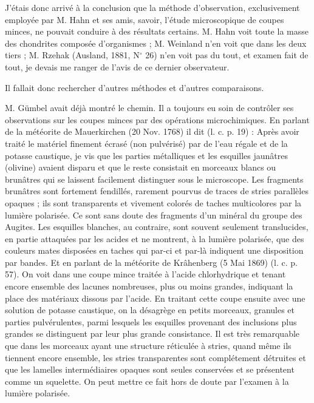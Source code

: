 \documentclass[a4paper, 12pt, oneside, french]{article}
\begin{document}
J'étais donc arrivé à la conclusion que la méthode d'observation, exclusivement employée par M. Hahn et ses amis, savoir, l'étude microscopique de coupes minces, ne pouvait conduire à des résultats certains. M. Hahn voit toute la masse des chondrites composée d'organismes ; M. Weinland n'en voit que dans les deux tiers ; M. Rzehak (Ausland, 1881, N$^{\circ}$ 26) n'en voit pas du tout, et examen fait de tout, je devais me ranger de l'avis de ce dernier observateur.

Il fallait donc rechercher d'autres méthodes et d'autres comparaisons.

M. Gümbel avait déjà montré le chemin. Il a toujours eu soin de contrôler ses observations sur les coupes minces par des opérations microchimiques. En parlant de la météorite de Mauerkirchen (20 Nov. 1768) il dit (l. c. p. 19) : \og Après avoir traité le matériel finement écrasé (non pulvérisé) par de l'eau régale et de la potasse caustique, je vis que les parties métalliques et les esquilles jaunâtres (olivine) avaient disparu et que le reste consistait en morceaux blancs ou brunâtres qui se laissent facilement distinguer sous le microscope. Les fragments brunâtres sont fortement fendillés, rarement pourvus de traces de stries parallèles opaques ; ils sont transparents et vivement colorés de taches multicolores par la lumière polarisée. Ce sont sans doute des fragments d'un minéral du groupe des Augites. Les esquilles blanches, au contraire, sont souvent seulement translucides, en partie attaquées par les acides et ne montrent, à la lumière polarisée, que des couleurs mates disposées en taches qui par-ci et par-là indiquent une disposition par bandes. \fg Et en parlant de la météorite de Krâhenberg (5 Mai 1869) (l. c. p. 57). On voit dans une coupe mince traitée à l'acide chlorhydrique et tenant encore ensemble des lacunes nombreuses, plus ou moins grandes, indiquant la place des matériaux dissous par l'acide. En traitant cette coupe ensuite avec une solution de potasse caustique, on la désagrège en petits morceaux, granules et parties pulvérulentes, parmi lesquels les esquilles provenant des inclusions plus grandes se distinguent par leur plus grande consistance. Il est très remarquable que dans les morceaux ayant une structure réticulée à stries, quand même ils tiennent encore ensemble, les stries transparentes sont complétement détruites et que les lamelles intermédiaires opaques sont seules conservées et se présentent comme un squelette. On peut mettre ce fait hors de doute par l'examen à la lumière polarisée. \fg
\end{document}

